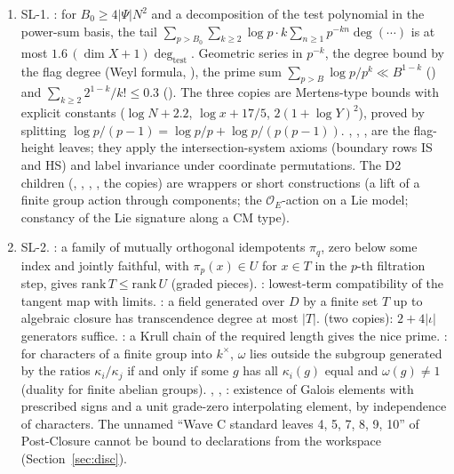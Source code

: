 \documentclass[10pt]{article}
\newcommand{\SL}[1]{\textsf{SL-#1}}
\begin{document}
\begin{enumerate}[nosep]
\item \SL{1}. : for $B_0\ge4\lvert\Psi\rvert N^2$ and a decomposition of the test polynomial in the power-sum basis, the tail $\sum_{p>B_0}\sum_{k\ge2}\log p\cdot k\sum_{n\ge1}p^{-kn}\deg(\cdots)$ is at most $1.6\,(\dim X+1)\deg_{\mathrm{test}}$. Geometric series in $p^{-k}$, the degree bound by the flag degree (Weyl formula, ), the prime sum $\sum_{p>B}\log p/p^k\ll B^{1-k}$ () and $\sum_{k\ge2}2^{1-k}/k!\le0.3$ (). The three  copies are Mertens-type bounds with explicit constants ($\log N+2.2$, $\log x+17/5$, $2(1+\log Y)^2$), proved by splitting $\log p/(p-1)=\log p/p+\log p/(p(p-1))$. , , ,  are the flag-height leaves; they apply the intersection-system axioms (boundary rows IS and HS) and label invariance under coordinate permutations. The D2 children (, , , , the  copies) are wrappers or short constructions (a lift of a finite group action through components; the $\mathcal O_E$-action on a Lie model; constancy of the Lie signature along a CM type).
\item \SL{2}. : a family of mutually orthogonal idempotents $\pi_q$, zero below some index and jointly faithful, with $\pi_p(x)\in U$ for $x\in T$ in the $p$-th filtration step, gives $\mathrm{rank}\,T\le\mathrm{rank}\,U$ (graded pieces). : lowest-term compatibility of the tangent map with limits. : a field generated over $D$ by a finite set $T$ up to algebraic closure has transcendence degree at most $\lvert T\rvert$.  (two copies): $2+4\lvert\iota\rvert$ generators suffice. : a Krull chain of the required length gives the nice prime. : for characters of a finite group into $k^\times$, $\omega$ lies outside the subgroup generated by the ratios $\kappa_i/\kappa_j$ if and only if some $g$ has all $\kappa_i(g)$ equal and $\omega(g)\ne1$ (duality for finite abelian groups). , , : existence of Galois elements with prescribed signs and a unit grade-zero interpolating element, by independence of characters. The unnamed ``Wave C standard leaves 4, 5, 7, 8, 9, 10'' of Post-Closure cannot be bound to declarations from the workspace (Section~\ref{sec:disc}).

\end{enumerate}
\end{document}
